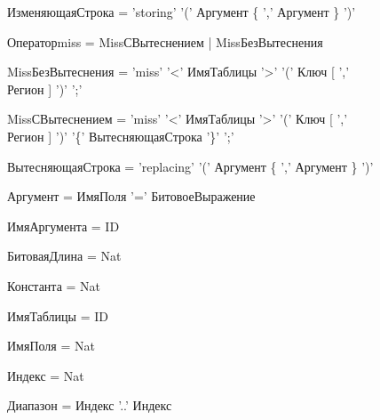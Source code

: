 {ИзменяющаяСтрока = 'storing' '('  Аргумент \{ ',' Аргумент \} ')'

Операторmiss = MissСВытеснением | MissБезВытеснения

MissБезВытеснения = 'miss' '<' ИмяТаблицы '>' '(' Ключ  [ ','\\ Регион ] ')' ';'

MissСВытеснением = 'miss' '<' ИмяТаблицы '>' '(' Ключ [ ',' \\ Регион ] ')' '\{' ВытесняющаяСтрока '\}' ';'

ВытесняющаяСтрока = 'replacing' '('  Аргумент \{ ',' Аргумент \} ')'

Аргумент = ИмяПоля '=' БитовоеВыражение

ИмяАргумента = ID

БитоваяДлина = Nat

Константа = Nat

ИмяТаблицы = ID

ИмяПоля = Nat

Индекс = Nat

Диапазон = Индекс '..' Индекс
}